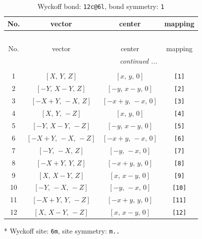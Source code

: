 \documentclass[fleqn,8pt]{jsarticle}
\begin{document}
\begin{longtable}{cccc}
\caption{Wyckoff bond: {\tt 12c@6l}, bond symmetry: {\tt 1}}
 \\
 \hline \hline
No. & vector & center & mapping \\ \hline \endfirsthead

\multicolumn{3}{l}{\tablename\ \thetable{}} \\
 \hline \hline
No. & vector & center & mapping \\ \hline \endhead

 \hline \hline
\multicolumn{3}{r}{\footnotesize\it continued ...} \\ \endfoot

 \hline \hline
\multicolumn{3}{r}{} \\ \endlastfoot

1 & $\left[ X,\, Y,\, Z \right]$ & $\left[ x,\, y,\, 0 \right]$ & {\tt [1]} \\ \hline
2 & $\left[ - Y,\, X - Y,\, Z \right]$ & $\left[ - y,\, x - y,\, 0 \right]$ & {\tt [2]} \\ \hline
3 & $\left[ - X + Y,\, - X,\, Z \right]$ & $\left[ - x + y,\, - x,\, 0 \right]$ & {\tt [3]} \\ \hline
4 & $\left[ X,\, Y,\, - Z \right]$ & $\left[ x,\, y,\, 0 \right]$ & {\tt [4]} \\ \hline
5 & $\left[ - Y,\, X - Y,\, - Z \right]$ & $\left[ - y,\, x - y,\, 0 \right]$ & {\tt [5]} \\ \hline
6 & $\left[ - X + Y,\, - X,\, - Z \right]$ & $\left[ - x + y,\, - x,\, 0 \right]$ & {\tt [6]} \\ \hline
7 & $\left[ - Y,\, - X,\, Z \right]$ & $\left[ - y,\, - x,\, 0 \right]$ & {\tt [7]} \\ \hline
8 & $\left[ - X + Y,\, Y,\, Z \right]$ & $\left[ - x + y,\, y,\, 0 \right]$ & {\tt [8]} \\ \hline
9 & $\left[ X,\, X - Y,\, Z \right]$ & $\left[ x,\, x - y,\, 0 \right]$ & {\tt [9]} \\ \hline
10 & $\left[ - Y,\, - X,\, - Z \right]$ & $\left[ - y,\, - x,\, 0 \right]$ & {\tt [10]} \\ \hline
11 & $\left[ - X + Y,\, Y,\, - Z \right]$ & $\left[ - x + y,\, y,\, 0 \right]$ & {\tt [11]} \\ \hline
12 & $\left[ X,\, X - Y,\, - Z \right]$ & $\left[ x,\, x - y,\, 0 \right]$ & {\tt [12]} \\
\end{longtable}
* Wyckoff site: {\tt 6m}, site symmetry: {\tt m..}
\renewcommand{\arraystretch}{1.2}
\end{document}
